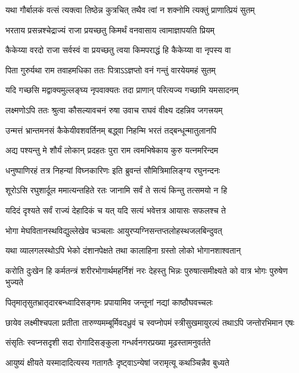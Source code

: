 \twolineshloka
{यथा गौर्बालकं वत्सं त्यक्त्वा तिष्ठेन्न कुत्रचित्}
{तथैव त्वां न शक्नोमि त्यक्तुं प्राणात्प्रियं सुतम्} %

\twolineshloka
{भरताय प्रसन्नश्चेद्राज्यं राजा प्रयच्छतु}
{किमर्थं वनवासाय त्वामाज्ञापयति प्रियम्} %

\twolineshloka
{कैकेय्या वरदो राजा सर्वस्वं वा प्रयच्छतु}
{त्वया किमपराद्धं हि कैकेय्या वा नृपस्य वा} %

\twolineshloka
{पिता गुरुर्यथा राम तवाहमधिका ततः}
{पित्राऽऽज्ञप्तो वनं गन्तुं वारयेयमहं सुतम्} %

\twolineshloka
{यदि गच्छसि मद्वाक्यमुल्लङ्घ्य नृपवाक्यतः}
{तदा प्राणान् परित्यज्य गच्छामि यमसादनम्} %

\twolineshloka
{लक्ष्मणोऽपि ततः श्रुत्वा कौसल्यावचनं रुषा}
{उवाच राघवं वीक्ष्य दहन्निव जगत्त्रयम्} %

\twolineshloka
{उन्मत्तं भ्रान्तमनसं कैकेयीवशवर्तिनम्}
{बद्ध्वा निहन्मि भरतं तद्बन्धून्मातुलानपि} %

\twolineshloka
{अद्य पश्यन्तु मे शौर्यं लोकान् प्रदहतः पुरा}
{राम त्वमभिषेकाय कुरु यत्नमरिन्दम} %

\twolineshloka
{धनुष्पाणिरहं तत्र निहन्यां विघ्नकारिणः}
{इति ब्रुवन्तं सौमित्रिमालिङ्ग्य रघुनन्दनः} %

\twolineshloka
{शूरोऽसि रघुशार्दूल ममात्यन्तहिते रतः}
{जानामि सर्वं ते सत्यं किन्तु तत्समयो न हि} %

\twolineshloka
{यदिदं दृश्यते सर्वं राज्यं देहादिकं च यत्}
{यदि सत्यं भवेत्तत्र आयासः सफलश्च ते} %

\twolineshloka
{भोगा मेघवितानस्थविद्युल्लेखेव चञ्चलाः}
{आयुरप्यग्निसन्तप्तलोहस्थजलबिन्दुवत्} %

\twolineshloka
{यथा व्यालगलस्थोऽपि भेको दंशानपेक्षते}
{तथा कालाहिना ग्रस्तो लोको भोगानशाश्वतान्} %

\fourlineindentedshloka
{करोति दुःखेन हि कर्मतन्त्रं}
{शरीरभोगार्थमहर्निशं नरः}
{देहस्तु भिन्नः पुरुषात्समीक्ष्यते}
{को वात्र भोगः पुरुषेण भुज्यते} %

\twolineshloka
{पितृमातृसुतभ्रातृदारबन्ध्वादिसङ्गमः}
{प्रपायामिव जन्तूनां नद्यां काष्ठौघवच्चलः} %

\fourlineindentedshloka
{छायेव लक्ष्मीश्चपला प्रतीता}
{तारुण्यमम्बूर्मिवदध्रुवं च}
{स्वप्नोपमं स्त्रीसुखमायुरल्पं}
{तथाऽपि जन्तोरभिमान एषः} %

\twolineshloka
{संसृतिः स्वप्नसदृशी सदा रोगादिसङ्कुला}
{गन्धर्वनगरप्रख्या मूढस्तामनुवर्तते} %

\twolineshloka
{आयुष्यं क्षीयते यस्मादादित्यस्य गतागतैः}
{दृष्ट्वाऽन्येषां जरामृत्यू कथञ्चिन्नैव बुध्यते} %

